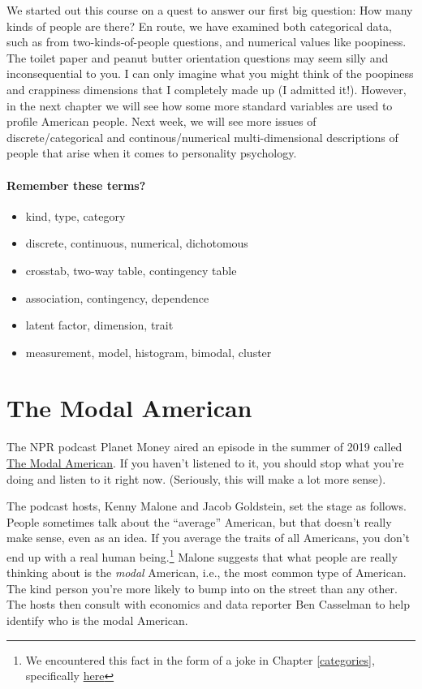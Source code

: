 \documentclass[openany]{book}
\providecommand{\tightlist}{%
  \setlength{\itemsep}{0pt}\setlength{\parskip}{0pt}}
\begin{document}
We started out this course on a quest to answer our first big question: How many kinds of people are there? En route, we have examined both categorical data, such as from two-kinds-of-people questions, and numerical values like poopiness. The toilet paper and peanut butter orientation questions may seem silly and inconsequential to you. I can only imagine what you might think of the poopiness and crappiness dimensions that I completely made up (I admitted it!). However, in the next chapter we will see how some more standard variables are used to profile American people. Next week, we will see more issues of discrete/categorical and continous/numerical multi-dimensional descriptions of people that arise when it comes to personality psychology.

\hypertarget{remember-these-terms}{%
\subsubsection*{Remember these terms?}\label{remember-these-terms}}

\begin{itemize}
\tightlist
\item
  kind, type, category
\item
  discrete, continuous, numerical, dichotomous
\item
  crosstab, two-way table, contingency table
\item
  association, contingency, dependence
\item
  latent factor, dimension, trait
\item
  measurement, model, histogram, bimodal, cluster
\end{itemize}

\hypertarget{the-modal-american}{%
\chapter{The Modal American}\label{the-modal-american}}

The NPR podcast Planet Money aired an episode in the summer of 2019 called \href{https://www.npr.org/2019/08/28/755191639/episode-936-the-modal-american}{The Modal American}. If you haven't listened to it, you should stop what you're doing and listen to it right now. (Seriously, this will make a lot more sense).

The podcast hosts, Kenny Malone and Jacob Goldstein, set the stage as follows. People sometimes talk about the ``average'' American, but that doesn't really make sense, even as an idea. If you average the traits of all Americans, you don't end up with a real human being.\footnote{We encountered this fact in the form of a joke in Chapter \ref{categories}, specifically \protect\hyperlink{no-mean-feat}{here}} Malone suggests that what people are really thinking about is the \emph{modal} American, i.e., the most common type of American. The kind person you're more likely to bump into on the street than any other. The hosts then consult with economics and data reporter Ben Casselman to help identify who is the modal American.
\end{document}
